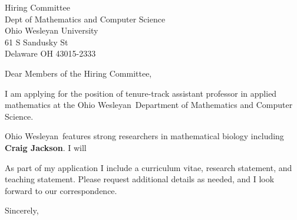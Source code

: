 \documentclass[11pt,a4paper]{letter}
\begin{document}
\def\School{Ohio Wesleyan}
\begin{letter}
{Hiring Committee\\
Dept of Mathematics and Computer Science\\
Ohio Wesleyan University\\
61 S Sandusky St\\
Delaware OH 43015-2333}


\opening{Dear Members of the Hiring Committee,}

I am applying for the position of tenure-track assistant professor in applied mathematics at the \School~Department of Mathematics and Computer Science. 



\School~features strong researchers in mathematical biology including \textbf{Craig Jackson}. I will 



As part of my application I include a curriculum vitae, research statement, and teaching statement. Please request additional details as needed, and I look forward to our correspondence.

\closing{Sincerely,}
\end{letter}
\end{document}
